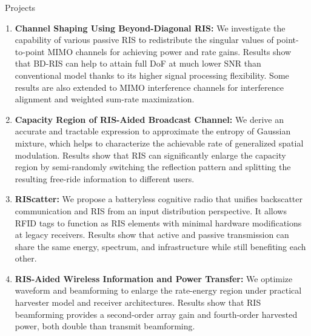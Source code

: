 \documentclass{cv}
\begin{document}
\begin{section}{\faPaperPlane\ Projects}
	\begin{enumerate}
		\item \textbf{Channel Shaping Using Beyond-Diagonal RIS:} We investigate the capability of various passive RIS to redistribute the singular values of point-to-point MIMO channels for achieving power and rate gains. Results show that BD-RIS can help to attain full DoF at much lower SNR than conventional model thanks to its higher signal processing flexibility. Some results are also extended to MIMO interference channels for interference alignment and weighted sum-rate maximization.
		\item \textbf{Capacity Region of RIS-Aided Broadcast Channel:} We derive an accurate and tractable expression to approximate the entropy of Gaussian mixture, which helps to characterize the achievable rate of generalized spatial modulation. Results show that RIS can significantly enlarge the capacity region by semi-randomly switching the reflection pattern and splitting the resulting free-ride information to different users.
		\item \textbf{RIScatter:} We propose a batteryless cognitive radio that unifies backscatter communication and RIS from an input distribution perspective. It allows RFID tags to function as RIS elements with minimal hardware modifications at legacy receivers. Results show that active and passive transmission can share the same energy, spectrum, and infrastructure while still benefiting each other.
		\item \textbf{RIS-Aided Wireless Information and Power Transfer:} We optimize waveform and beamforming to enlarge the rate-energy region under practical harvester model and receiver architectures. Results show that RIS beamforming provides a second-order array gain and fourth-order harvested power, both double than transmit beamforming.
	\end{enumerate}
\end{section}

\vspace{-1.5em}
\end{document}
